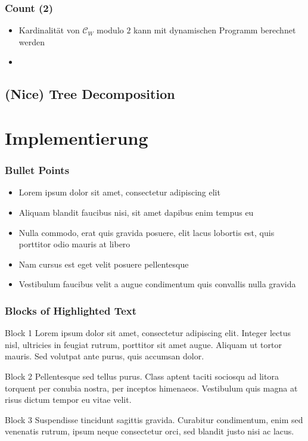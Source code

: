 \documentclass{beamer}
\begin{document}
\begin{frame}
\frametitle{Count (2)}
\begin{itemize}
\item Kardinalität von $\mathcal{C}_W$ modulo $2$ kann mit dynamischen Programm berechnet werden
\item 
\end{itemize}
\end{frame}
\subsection{(Nice) Tree Decomposition}
\begin{frame}
\end{frame}

\section{Implementierung}
\begin{frame}
\frametitle{Bullet Points}
\begin{itemize}
\item Lorem ipsum dolor sit amet, consectetur adipiscing elit
\item Aliquam blandit faucibus nisi, sit amet dapibus enim tempus eu
\item Nulla commodo, erat quis gravida posuere, elit lacus lobortis est, quis porttitor odio mauris at libero
\item Nam cursus est eget velit posuere pellentesque
\item Vestibulum faucibus velit a augue condimentum quis convallis nulla gravida
\end{itemize}
\end{frame}


\begin{frame}
\frametitle{Blocks of Highlighted Text}
\begin{block}{Block 1}
Lorem ipsum dolor sit amet, consectetur adipiscing elit. Integer lectus nisl, ultricies in feugiat rutrum, porttitor sit amet augue. Aliquam ut tortor mauris. Sed volutpat ante purus, quis accumsan dolor.
\end{block}

\begin{block}{Block 2}
Pellentesque sed tellus purus. Class aptent taciti sociosqu ad litora torquent per conubia nostra, per inceptos himenaeos. Vestibulum quis magna at risus dictum tempor eu vitae velit.
\end{block}

\begin{block}{Block 3}
Suspendisse tincidunt sagittis gravida. Curabitur condimentum, enim sed venenatis rutrum, ipsum neque consectetur orci, sed blandit justo nisi ac lacus.
\end{block}
\end{frame}
\end{document}
